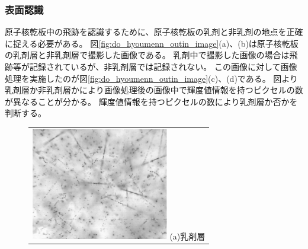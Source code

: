 \documentclass[12pt,a4paper]{jarticle}
\begin{document}
\subsubsection{表面認識}
原子核乾板中の飛跡を認識するために、原子核乾板の乳剤と非乳剤の地点を正確に捉える必要がある。
図\ref{fig:do_hyoumenn_outin_image}(a)、(b)は原子核乾板の乳剤層と非乳剤層で撮影した画像である。
乳剤中で撮影した画像の場合は飛跡等が記録されているが、非乳剤層では記録されない。
この画像に対して画像処理を実施したのが図\ref{fig:do_hyoumenn_outin_image}(c)、(d)である。
図より乳剤層か非乳剤層かにより画像処理後の画像中で輝度値情報を持つピクセルの数が異なることが分かる。
輝度値情報を持つピクセルの数により乳剤層か否かを判断する。
\begin{figure}[htbp]
  \centering
      \begin{tabular}{c}
        \begin{minipage}{0.5\hsize}
          \centering
            \includegraphics[clip, width=60mm]{emulsion_in.png}
            \hspace{1.6cm} (a)乳剤層
        \end{minipage}
        

\end{tabular}
\end{figure}
\end{document}
